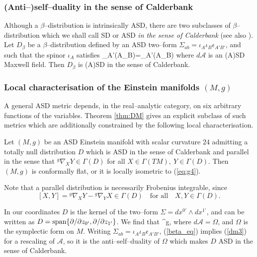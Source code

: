 \subsubsection{(Anti--)self--duality in the sense of Calderbank}
Although a $\beta$--distribution is intrinsically ASD, there are two subclasses of $\beta$--distribution which we shall call SD or ASD \textit{in the sense of Calderbank} \cite{Cal1} (see also \cite{West}). Let $D_\beta$ be a $\beta$--distribution defined by an ASD two--form $\Sigma_{ab}=\iota_A\iota_B\epsilon_{A'B'}$, and  such that the spinor $\iota_A$ satisfies
\be
\label{dm3}
\nabla_{A'(A}\iota_{B)}=_{A'(A}\iota_{B)}
\ee
where $d\mathcal{A}$ is an (A)SD Maxwell field. Then $D_\beta$ is (A)SD in the sense of Calderbank.

 
\subsubsection{Local characterisation of the Einstein manifolds $(M,g)$}

A general ASD metric depends, in the real--analytic category, on six arbitrary functions of the variables. Theorem \ref{thm:DM} gives an explicit subclass of such metrics which are additionally constrained by the following local characterisation.

\begin{theo}\cite{DM} \label{thm:DMcharacterisation}
Let $(M,g)$ be an ASD Einstein manifold with scalar curvature $24$ admitting a totally null distribution $D$ which is ASD in the sense of Calderbank and parallel in the sense that $^g\nabla_XY\in\Gamma(D)$ for all $X\in \Gamma(TM),\ Y\in\Gamma(D)$. Then $(M,g)$ is conformally flat, or it is locally isometric to (\ref{eq:g4}).
\end{theo}
\noindent
Note that a parallel distribution is necessarily Frobenius integrable, since
\[
[X,Y]= {^g}\nabla_XY- {^g}\nabla_YX\in\Gamma(D)\quad\mbox{for all}\quad X,Y\in\Gamma(D).
\]

In our coordinates $D$ is the kernel of the two--form $\Sigma=dx^{0'}\wedge dx^{1'}$, and can be written as ${D}=\mathrm{span}\{\partial/\partial z_{0'},\partial/\partial z_{1'}\}$. We find that
\be
\label{beta_eq}
^g\nabla{}\otimes \Sigma,
\ee
where $d\mathcal{A}=\Omega$, and $\Omega$ is the symplectic form on $M$. Writing $\Sigma_{ab}=\iota_A\iota_B\epsilon_{A'B'}$, (\ref{beta_eq}) implies (\ref{dm3}) for a rescaling of $\mathcal{A}$, so it is the anti--self--duality of $\Omega$ which makes $D$ ASD in the sense of Calderbank. 

